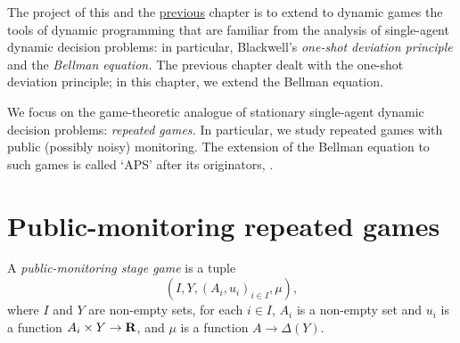 




The project of this and the \hyperref[ch_osdp]{previous} chapter is to extend to dynamic games the tools of dynamic programming that are familiar from the analysis of single-agent dynamic decision problems: in particular, Blackwell's \emph{one-shot deviation principle} and the \emph{Bellman equation.} The previous chapter dealt with the one-shot deviation principle; in this chapter, we extend the Bellman equation.

We focus on the game-theoretic analogue of stationary single-agent dynamic decision problems: \emph{repeated games.} In particular, we study repeated games with public (possibly noisy) monitoring. The extension of the Bellman equation to such games is called `APS' after its originators, \textcite{AbreuPearceStacchetti1990}.



\section{Public-monitoring repeated games}
\label{aps:games}

\begin{definition}
	\label{definition:stage_game}
	A \emph{public-monitoring stage game} is a tuple
	\begin{equation*}
		\left( I, Y, (A_i, u_i)_{i \in I}, \mu \right) ,
	\end{equation*}
	where $I$ and $Y$ are non-empty sets, for each $i \in I$, $A_i$ is a non-empty set and $u_i$ is a function $A_i \times Y \to \mathbf{R}$, and $\mu$ is a function $A \to \Delta(Y)$.
\end{definition}

